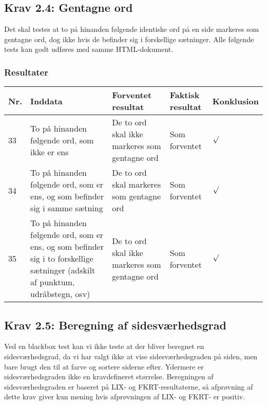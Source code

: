 \documentclass[a4paper,oneside,article]{memoir}
\begin{document}
\begin{landscape}
\begin{longtable}[c]{p{20pt}|p{220pt}|p{130pt}|p{130pt}|p{50pt}}
\end{longtable}

\subsection{Krav 2.4: Gentagne ord}

Det skal testes at to på hinanden følgende identiske ord på en side
markeres som gentagne ord, dog ikke hvis de befinder sig i forskellige
sætninger. Alle følgende tests kan godt udføres med samme
HTML-dokument.

\subsubsection{Resultater}
\begin{longtable}[c]{p{20pt}|p{220pt}|p{130pt}|p{130pt}|p{50pt}}
\textbf{Nr.} &
\textbf{Inddata} &
\textbf{Forventet resultat} &
\textbf{Faktisk resultat} &
\textbf{Konklusion} \\ \hline

33 &
To på hinanden følgende ord, som ikke er ens &
De to ord skal ikke markeres som gentagne ord &
Som forventet &
$\surd$ \\ \hline

34 &
To på hinanden følgende ord, som er ens, og som befinder sig i samme
sætning &
De to ord skal markeres som gentagne ord &
Som forventet &
$\surd$ \\ \hline

35 &
To på hinanden følgende ord, som er ens, og som befinder sig i
to forskellige sætninger (adskilt af punktum, udråbstegn, osv) &
De to ord skal ikke markeres som gentagne ord &
Som forventet &
$\surd$ \\ \hline

\end{longtable}

\subsection{Krav 2.5: Beregning af sidesværhedsgrad}
Ved en blackbox test kan vi ikke teste at der bliver beregnet en
sidesværhedsgrad, da vi har valgt ikke at vise sidesværhedsgraden på
siden, men bare brugt den til at farve og sortere siderne
efter. Ydermere er sidesværhedsgraden ikke en kravdefineret
størrelse. Beregningen af sidesværhedsgraden er baseret på LIX- og
FKRT-resultaterne, så afprøvning af dette krav giver kun mening hvis
afprøvningen af LIX- og FKRT- er positiv.


\end{landscape}
\end{document}
